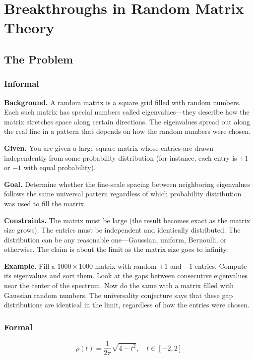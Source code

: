 \let\LocalMacro\relax

\chapter{Breakthroughs in Random Matrix Theory}

\section{The Problem}

\subsection{Informal}

\textbf{Background.} A random matrix is a square grid filled with random numbers. Each such matrix has special numbers called eigenvalues---they describe how the matrix stretches space along certain directions. The eigenvalues spread out along the real line in a pattern that depends on how the random numbers were chosen.

\textbf{Given.} You are given a large square matrix whose entries are drawn independently from some probability distribution (for instance, each entry is $+1$ or $-1$ with equal probability).

\textbf{Goal.} Determine whether the fine-scale spacing between neighboring eigenvalues follows the same universal pattern regardless of which probability distribution was used to fill the matrix.

\textbf{Constraints.} The matrix must be large (the result becomes exact as the matrix size grows). The entries must be independent and identically distributed. The distribution can be any reasonable one---Gaussian, uniform, Bernoulli, or otherwise. The claim is about the limit as the matrix size goes to infinity.

\textbf{Example.} Fill a $1000 \times 1000$ matrix with random $+1$ and $-1$ entries. Compute its eigenvalues and sort them. Look at the gaps between consecutive eigenvalues near the center of the spectrum. Now do the same with a matrix filled with Gaussian random numbers. The universality conjecture says that these gap distributions are identical in the limit, regardless of how the entries were chosen.

\subsection{Formal}
\begin{equation}
\rho(t) = \frac{1}{2\pi} \sqrt{4 - t^2}, \quad t \in [-2, 2]
\end{equation}

